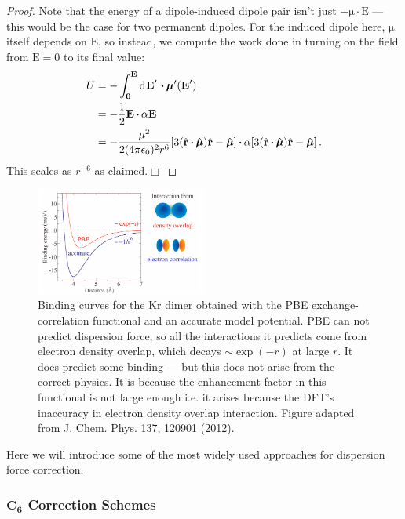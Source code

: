 \documentclass{article}
\theoremstyle{plain}\theoremheaderfont{\normalfont\itshape}\theorembodyfont{\rmfamily}\theoremseparator{.}\newtheorem*{rem}{Remark}\newtheorem*{ex}{Example}\newtheorem*{proof}{Proof}\newtheorem*{altp}{Alternative proof}
\theoremstyle{plain}\theoremheaderfont{\normalfont\bfseries}\theorembodyfont{\rmfamily}\theoremseparator{.}\newtheorem{thm}{Theorem}[section]\newtheorem{lem}[thm]{Lemma}\newtheorem{prop}[thm]{Proposition}\newtheorem*{cor}{Corollary}\newtheorem{defn}[thm]{Definition}\newtheorem{clm}[thm]{Claim}\newtheorem{clminproof}{Claim}\newtheorem{pos}{Postulate}[section]
\theoremstyle{break}\theoremheaderfont{\normalfont\itshape}\theorembodyfont{\rmfamily}\theoremseparator{.\medskip}\newtheorem*{proofskip}{Proof}\newtheorem*{exs}{Examples}\newtheorem*{rems}{Remarks}
\theoremstyle{break}\theoremheaderfont{\normalfont\bfseries}\theorembodyfont{\rmfamily}\theoremseparator{.\medskip}\newtheorem{lemskip}[thm]{Lemma}\newtheorem{defnskip}[thm]{Definition}\newtheorem{propskip}[thm]{Proposition}\newtheorem{thmskip}[thm]{Theorem}
\numberwithin{equation}{section}
\newcommand{\qed}{\hfill\ensuremath{\Box}}
\newcommand{\dd}[2][]{\mathrm{d}^{#1} #2\,}
\newcommand{\vb}[1]{\bm{\mathrm{#1}}}
\newcommand{\vu}[1]{\hat{\bm{\mathrm{#1}}}}
\newcommand{\vdot}{\,\bm{\mathrm{\cdot}}\,}
\begin{document}
\begin{proof}
        Note that the energy of a dipole-induced dipole pair isn't just \(-\vb{\mu}\vdot\vb{E}\) --- this would be the case for two permanent dipoles. For the induced dipole here, \(\vb{\mu}\) itself depends on \(\vb{E}\), so instead, we compute the work done in turning on the field from \(\vb{E}=\vb{0}\) to its final value:
        \begin{align}
            U&=-\int_{\vb{0}}^{\vb{E}}\dd{\vb{E}'}\vdot\vb{\mu}'(\vb{E}')\notag\\
            &=-\frac{1}{2}\vb{E}\vdot\alpha\vb{E}\notag\\
            &=-\frac{\mu^2}{2(4\pi\epsilon_0)^2 r^6}[3(\vu{r}\vdot\vu{\mu})\vu{r}-\vu{\mu}]\vdot\alpha[3(\vu{r}\vdot\vu{\mu})\vu{r}-\vu{\mu}]\,.
        \end{align}
        This scales as \(r^{-6}\) as claimed.\qed
    \end{proof}

    \begin{figure}
        \centering
        \includegraphics[width=0.5\textwidth]{dispersion.png}
        \caption{Binding curves for the Kr dimer obtained with the PBE exchange-correlation functional and an accurate model potential. PBE can not predict dispersion force, so all the interactions it predicts come from electron density overlap, which decays \(\sim \exp(-r)\) at large \(r\). It does predict some binding --- but this does not arise from the correct physics. It is because the enhancement factor in this functional is not large enough i.e. it arises because the DFT's inaccuracy in electron density overlap interaction. Figure adapted from J. Chem. Phys. 137, 120901 (2012).}
    \end{figure}

    Here we will introduce some of the most widely used approaches for dispersion force correction.

    \subsubsection{\texorpdfstring{\(\bm{C_6}\)}{C6} Correction Schemes}
\end{document}
